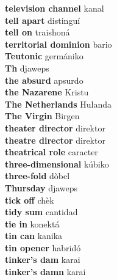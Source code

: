 \textbf{ television channel  } kanal \\
\textbf{ tell apart  } distinguí \\
\textbf{ tell on  } traishoná \\
\textbf{ territorial dominion  } bario \\
\textbf{ Teutonic  } germániko \\
\textbf{ Th  } djaweps \\
\textbf{ the absurd  } apsurdo \\
\textbf{ the Nazarene  } Kristu \\
\textbf{ The Netherlands  } Hulanda \\
\textbf{ The Virgin  } Birgen \\
\textbf{ theater director  } direktor \\
\textbf{ theatre director  } direktor \\
\textbf{ theatrical role  } caracter \\
\textbf{ three-dimensional  } kúbiko \\
\textbf{ three-fold  } dòbel \\
\textbf{ Thursday  } djaweps \\
\textbf{ tick off  } chèk \\
\textbf{ tidy sum  } cantidad \\
\textbf{ tie in  } konektá \\
\textbf{ tin can  } kanika \\
\textbf{ tin opener  } habridó \\
\textbf{ tinker’s dam  } karai \\
\textbf{ tinker’s damn  } karai \\

